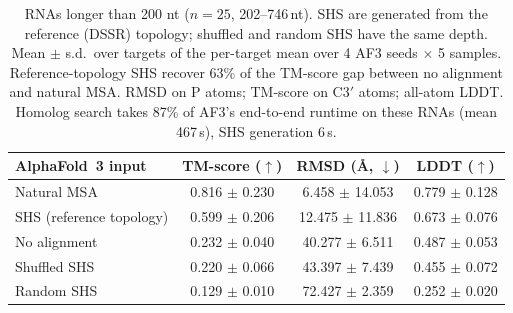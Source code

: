 \begin{table}[t]
\centering
\caption{RNAs longer than 200 nt ($n{=}25$, 202--746\,nt). SHS are generated from the reference (DSSR) topology; shuffled and random SHS have the same depth. Mean $\pm$ s.d.\ over targets of the per-target mean over 4 AF3 seeds $\times$ 5 samples. Reference-topology SHS recover 63\% of the TM-score gap between no alignment and natural MSA. RMSD on P atoms; TM-score on C3$'$ atoms; all-atom LDDT. Homolog search takes 87\% of AF3's end-to-end runtime on these RNAs (mean 467\,s), SHS generation 6\,s.}
\label{tab:long_rna}
\begin{tabular}{lccc}
\toprule
AlphaFold~3 input & TM-score ($\uparrow$) & RMSD (\AA, $\downarrow$) & LDDT ($\uparrow$) \\
\midrule
Natural MSA & 0.816 $\pm$ 0.230 & 6.458 $\pm$ 14.053 & 0.779 $\pm$ 0.128 \\
SHS (reference topology) & 0.599 $\pm$ 0.206 & 12.475 $\pm$ 11.836 & 0.673 $\pm$ 0.076 \\
No alignment & 0.232 $\pm$ 0.040 & 40.277 $\pm$ 6.511 & 0.487 $\pm$ 0.053 \\
Shuffled SHS & 0.220 $\pm$ 0.066 & 43.397 $\pm$ 7.439 & 0.455 $\pm$ 0.072 \\
Random SHS & 0.129 $\pm$ 0.010 & 72.427 $\pm$ 2.359 & 0.252 $\pm$ 0.020 \\
\bottomrule
\end{tabular}
\end{table}

